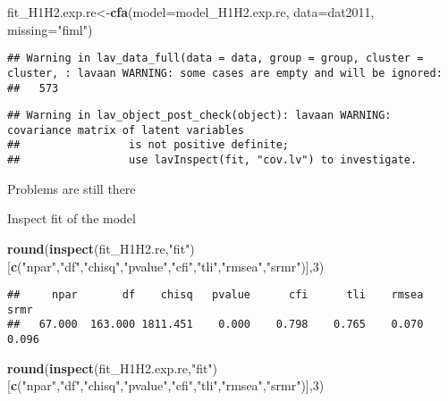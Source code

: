 \documentclass[
]{article}
\newenvironment{Shaded}{\begin{snugshade}}{\end{snugshade}}
\newcommand{\DataTypeTok}[1]{\textcolor[rgb]{0.13,0.29,0.53}{#1}}
\newcommand{\DecValTok}[1]{\textcolor[rgb]{0.00,0.00,0.81}{#1}}
\newcommand{\KeywordTok}[1]{\textcolor[rgb]{0.13,0.29,0.53}{\textbf{#1}}}
\newcommand{\NormalTok}[1]{#1}
\newcommand{\StringTok}[1]{\textcolor[rgb]{0.31,0.60,0.02}{#1}}
\begin{document}
\begin{Shaded}
\begin{Highlighting}[]
\NormalTok{fit_H1H2.exp.re<-}\KeywordTok{cfa}\NormalTok{(}\DataTypeTok{model=}\NormalTok{model_H1H2.exp.re,}
              \DataTypeTok{data=}\NormalTok{dat2011,}
              \DataTypeTok{missing=}\StringTok{"fiml"}\NormalTok{)}
\end{Highlighting}
\end{Shaded}

\begin{verbatim}
## Warning in lav_data_full(data = data, group = group, cluster = cluster, : lavaan WARNING: some cases are empty and will be ignored:
##   573
\end{verbatim}

\begin{verbatim}
## Warning in lav_object_post_check(object): lavaan WARNING: covariance matrix of latent variables
##                 is not positive definite;
##                 use lavInspect(fit, "cov.lv") to investigate.
\end{verbatim}

Problems are still there

Inspect fit of the model

\begin{Shaded}
\begin{Highlighting}[]
\KeywordTok{round}\NormalTok{(}\KeywordTok{inspect}\NormalTok{(fit_H1H2.re,}\StringTok{"fit"}\NormalTok{)}
\NormalTok{      [}\KeywordTok{c}\NormalTok{(}\StringTok{"npar"}\NormalTok{,}\StringTok{"df"}\NormalTok{,}\StringTok{"chisq"}\NormalTok{,}\StringTok{"pvalue"}\NormalTok{,}\StringTok{"cfi"}\NormalTok{,}\StringTok{"tli"}\NormalTok{,}\StringTok{"rmsea"}\NormalTok{,}\StringTok{"srmr"}\NormalTok{)],}\DecValTok{3}\NormalTok{)}
\end{Highlighting}
\end{Shaded}

\begin{verbatim}
##     npar       df    chisq   pvalue      cfi      tli    rmsea     srmr 
##   67.000  163.000 1811.451    0.000    0.798    0.765    0.070    0.096
\end{verbatim}

\begin{Shaded}
\begin{Highlighting}[]
\KeywordTok{round}\NormalTok{(}\KeywordTok{inspect}\NormalTok{(fit_H1H2.exp.re,}\StringTok{"fit"}\NormalTok{)}
\NormalTok{      [}\KeywordTok{c}\NormalTok{(}\StringTok{"npar"}\NormalTok{,}\StringTok{"df"}\NormalTok{,}\StringTok{"chisq"}\NormalTok{,}\StringTok{"pvalue"}\NormalTok{,}\StringTok{"cfi"}\NormalTok{,}\StringTok{"tli"}\NormalTok{,}\StringTok{"rmsea"}\NormalTok{,}\StringTok{"srmr"}\NormalTok{)],}\DecValTok{3}\NormalTok{)}
\end{Highlighting}
\end{Shaded}
\end{document}

